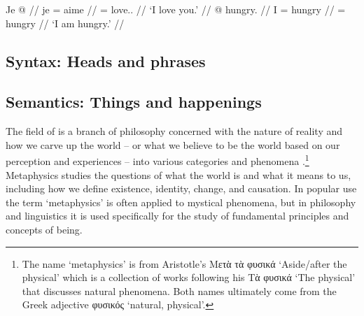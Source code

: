 \pex\label{exx:arg+val-args-obj-prons-nontl-clitics}%
\a\label{ex:arg+val-args-obj-prons-nontl-clitics-pro}%
%
\begingl
	\gla	Je  @ {} //
	\glb	je = aime //
	\glc	{} = love.. //
	\glft	‘I love you.’
		//
\endgl
\a\label{ex:arg+val-args-obj-nontl-prons-clitics-en}%
%
\begingl
	\gla	{} @ {} hungry. //
	\glb	I = hungry //
	\glc	{} = hungry //
	\glft	‘I am hungry.’
		//
\endgl
\xe

\subsection{Syntax: Heads and phrases}\label{sec:intro-ling-synx}








\subsection{Semantics: Things and happenings}\label{sec:intro-ling-sem}


The field of  is a branch of philosophy concerned with the nature of reality and how we carve up the world – or what we believe to be the world based on our perception and experiences – into various  categories and phenomena \parencite{van-inwagen-sullivan:2015}.\footnote{The name ‘metaphysics’ is from Aristotle’s Μετὰ τὰ φυσικά  ‘Aside/after the physical’ which is a collection of works following his Τὰ φυσικά  ‘The physical’ that discusses natural phenomena. Both names ultimately come from the Greek adjective φυσικός  ‘natural, physical’.} Metaphysics studies the questions of what the world is and what it means to us, including how we define existence, identity, change, and causation. In popular use the term ‘metaphysics’ is often applied to mystical phenomena, but in philosophy and linguistics it is used specifically for the study of fundamental principles and concepts of being.

